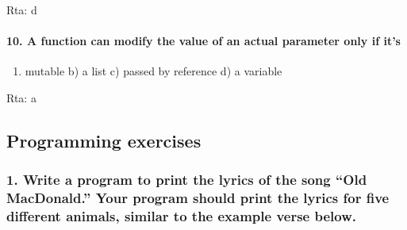 \documentclass[11pt]{article}
\providecommand{\tightlist}{%
      \setlength{\itemsep}{0pt}\setlength{\parskip}{0pt}}
\begin{document}
Rta: d

    \paragraph{10. A function can modify the value of an actual parameter
only if
it's}\label{a-function-can-modify-the-value-of-an-actual-parameter-only-if-its}

\begin{enumerate}
\def\labelenumi{\alph{enumi})}
\tightlist
\item
  mutable b) a list c) passed by reference d) a variable
\end{enumerate}

Rta: a

    \subsection{Programming exercises}\label{programming-exercises}

    \subsubsection{1. Write a program to print the lyrics of the song ``Old
MacDonald.'' Your program should print the lyrics for five different
animals, similar to the example verse
below.}\label{write-a-program-to-print-the-lyrics-of-the-song-old-macdonald.-your-program-should-print-the-lyrics-for-five-different-animals-similar-to-the-example-verse-below.}
\end{document}
